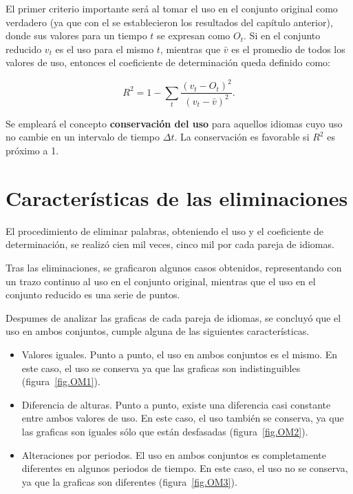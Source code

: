 El primer criterio importante será al tomar el uso en el conjunto original como verdadero (ya que con el se establecieron los resultados del capítulo anterior),  donde sus valores para un tiempo $t$ se expresan como $O_{t}$. Si en el conjunto reducido  $v_{t}$ es el uso para el mismo $t$, mientras que  $\bar{v}$ es el promedio de todos los valores de uso, entonces  el coeficiente de determinación queda definido como:

\begin{equation}
\label{ec.dif_uso}
R^{2} = 1 - \sum_{t} \frac{ \left( v_{t}- O_{t} \right)^{2}  }{ \left( v_{t} - \bar{v} \right)^{2} }.
\end{equation}

Se empleará el concepto \textbf{conservación del uso} para aquellos idiomas cuyo uso no cambie en un intervalo de tiempo $\Delta t$. La conservación es favorable si $R^{2}$ es próximo a 1. 

\section{Características de las eliminaciones}

El procedimiento de eliminar palabras, obteniendo el uso y el coeficiente de determinación, se realizó cien mil veces, cinco mil por cada pareja de idiomas.

Tras las eliminaciones, se graficaron algunos casos obtenidos, representando con un trazo continuo al uso en el conjunto original, mientras que el uso en el conjunto reducido es una serie de puntos.

Despumes de analizar las graficas de cada pareja de idiomas, se concluyó  que el uso en ambos conjuntos, cumple alguna de las siguientes características.


\begin{itemize}
	
	\item Valores iguales. Punto a punto, el uso en ambos conjuntos es el mismo. En este caso, el uso se conserva ya que las graficas son indistinguibles (figura~\ref{fig.OM1}).
	
	\item Diferencia de alturas. Punto a punto, existe una diferencia casi constante entre ambos valores de uso. En este caso, el uso también se conserva, ya que las graficas son iguales sólo que están desfasadas (figura~\ref{fig.OM2}).  
	
	\item Alteraciones por periodos. El uso en ambos conjuntos es completamente diferentes en algunos periodos de tiempo. En este caso, el uso no se conserva, ya que la graficas son diferentes (figura~\ref{fig.OM3}).

\end{itemize}



